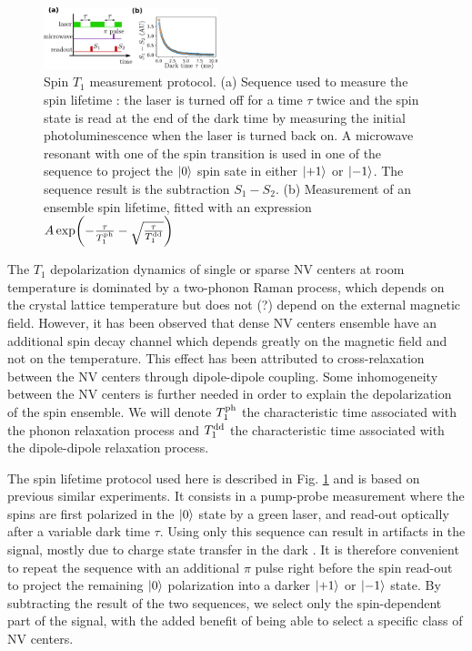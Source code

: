 \documentclass[preprintnumbers,amsmath,amssymb,superscriptaddress,twocolumn,showpacs]{revtex4-2}
\begin{document}
\begin{figure}
\includegraphics[width=0.45\textwidth]{Figures/fig T1}
\caption{Spin $T_1$ measurement protocol. (a) Sequence used to measure the spin lifetime : the laser is turned off for a time $\tau$ twice and the spin state is read at the end of the dark time by measuring the initial photoluminescence when the laser is turned back on. A microwave resonant with one of the spin transition is used in one of the sequence to project the $\ket{0}$ spin sate in either $\ket{+1}$ or $\ket{-1}$. The sequence result is the subtraction $S_1-S_2$. (b) Measurement of an ensemble spin lifetime, fitted with an expression $A \exp (-\frac{\tau}{T_1^{\rm ph}} -\sqrt{\frac{\tau}{T_1^{\rm dd}}})$}
\label{T1}
\end{figure}

The $T_1$ depolarization dynamics of single or sparse NV centers at room temperature is dominated by a two-phonon Raman process, which depends on the crystal lattice temperature but does not (?) depend on the external magnetic field. However, it has been observed that dense NV centers ensemble have an additional spin decay channel which depends greatly on the magnetic field and not on the temperature. This effect has been attributed to cross-relaxation between the NV centers through dipole-dipole coupling. Some inhomogeneity between the NV centers is further needed in order to explain the depolarization of the spin ensemble. We will denote $T_1^{\rm ph}$ the characteristic time associated with the phonon relaxation process and $T_1^{\rm dd}$ the characteristic time associated with the dipole-dipole relaxation process.

The spin lifetime protocol used here is described in Fig. \ref{T1} and is based on previous similar experiments. It consists in a pump-probe measurement where the spins are first polarized in the $\ket{0}$ state by a green laser, and read-out optically after a variable dark time $\tau$. Using only this sequence can result in artifacts in the signal, mostly due to charge state transfer in the dark \citep{giri_coupled_2018}. It is therefore convenient to repeat the sequence with an additional $\pi$ pulse right before the spin read-out to project the remaining $\ket{0}$ polarization into a darker $\ket{+1}$ or $\ket{-1}$ state. By subtracting the result of the two sequences, we select only the spin-dependent part of the signal, with the added benefit of being able to select a specific class of NV centers. 
\end{document}

